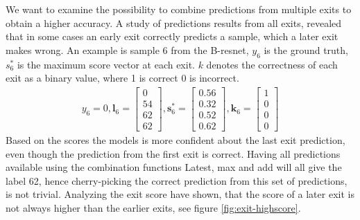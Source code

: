We want to examine the possibility to combine predictions from multiple exits to obtain a higher accuracy. A study of predictions results from all exits, revealed that in some cases an early exit correctly predicts a sample, which a later exit makes wrong. An example is sample 6 from the B-\gls{resnet}, $ y_6 $ is the ground truth, $ s^*_6 $ is the maximum score vector at each exit. $ k $ denotes the correctness of each exit as a binary value, where 1 is correct 0 is incorrect.
\begin{align*}
y_6=0,
\mathbf{l}_{6}=
\begin{bmatrix}
0 \\
54 \\
62 \\
62
\end{bmatrix},
\mathbf{s}^{*}_{6}=
\begin{bmatrix}
0.56 \\
0.32 \\
0.52 \\
0.62
\end{bmatrix},
\mathbf{k}_{6}=
\begin{bmatrix}
1 \\
0 \\
0 \\
0
\end{bmatrix}
\end{align*}
Based on the scores the models is more confident about the last exit prediction, even though the prediction from the first exit is correct. Having all predictions available using the combination functions Latest, max and add will all give the label 62, hence cherry-picking the correct prediction from this set of predictions, is not trivial. Analyzing the exit score have shown, that the score of a later exit is not always higher than the earlier exits, see figure \ref{fig:exit-highscore}.

